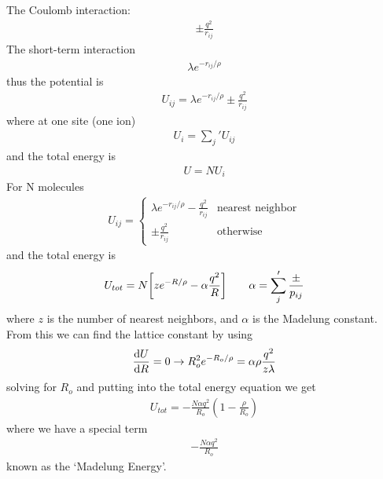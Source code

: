 \documentclass[../main.tex]{subfiles}
\begin{document}
The Coulomb interaction: 
\begin{align*}
    \pm \frac{q^2}{r_{ij}}
\end{align*}
The short-term interaction 
\begin{align*}
    \lambda e^{-r_{ij}/\rho}
\end{align*}
thus the potential is
\begin{align*}
    U_{ij} = \lambda e^{-r_{ij}/\rho} \pm \frac{q^2}{r_{ij}}
\end{align*}
where at one site (one ion)
\begin{align*}
    U_i = \sum_j' U_{ij}
\end{align*}
and the total energy is
\begin{align*}
    U = N U_i
\end{align*}
For N molecules
\begin{align*}
    U_{ij} = \begin{cases}
        \lambda e^{-r_{ij}/\rho} - \frac{q^2}{r_{ij}} & \text{nearest neighbor} \\
        \pm \frac{q^2}{r_{ij}} & \text{otherwise}
    \end{cases}
\end{align*}
and the total energy is
\begin{align*}
    U_{tot} = N \qt[z e^{-R/\rho} - \alpha \frac{q^2}{R}] \qquad \alpha = \sum_j' \frac{\pm}{p_{ij}}
\end{align*}
where $z$ is the number of nearest neighbors, and $\alpha$ is the Madelung constant. From this we
can find the lattice constant by using
\begin{align*}
    \dv{U}{R} = 0 \rightarrow R_o^2 e^{-R_o/\rho} = \alpha \rho \frac{q^2}{z\lambda}
\end{align*}
solving for $R_o$ and putting into the total energy equation we get
\begin{align*}
    U_{tot} = -\frac{N\alpha q^2}{R_o} (1 - \frac{\rho}{R_o}) 
\end{align*}
where we have a special term
\begin{align*}
    -\frac{N\alpha q^2}{R_o}
\end{align*}
known as the `Madelung Energy'.

\pagebreak
{}
\end{document}
